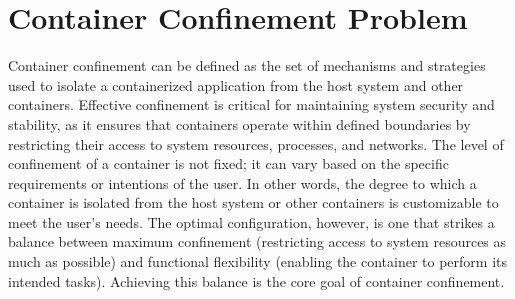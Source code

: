 \section{Container Confinement Problem}
\label{sec:confinement}



Container confinement can be defined as the set of mechanisms and strategies used to isolate a containerized application from the host system and other containers. Effective confinement is critical for maintaining system security and stability, as it ensures that containers operate within defined boundaries by restricting their access to system resources, processes, and networks. The level of confinement of a container is not fixed; it can vary based on the specific requirements or intentions of the user. In other words, the degree to which a container is isolated from the host system or other containers is customizable to meet the user’s needs. The optimal configuration, however, is one that strikes a balance between maximum confinement (restricting access to system resources as much as possible) and functional flexibility (enabling the container to perform its intended tasks). Achieving this balance is the core goal of container confinement.

